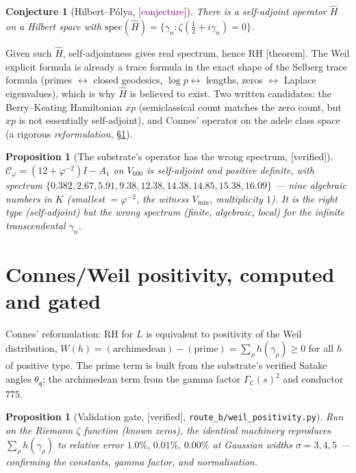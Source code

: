 \documentclass[11pt,a4paper]{article}
\newtheorem{proposition}[theorem]{Proposition}
\newtheorem{conjecture}[theorem]{Conjecture}
\theoremstyle{definition}
\newcommand{\C}{\mathbb{C}}
\newcommand{\Cphi}{\mathcal{C}_{\!\varphi}}
\newcommand{\Vmin}{V_{\min}}
\newcommand{\TAGthm}{{\small\textsf{[\textcolor{green!45!black}{theorem}]}}}
\newcommand{\TAGver}{{\small\textsf{[\textcolor{blue!60!black}{verified}]}}}
\newcommand{\TAGconj}{{\small\textsf{[\textcolor{purple}{conjecture}]}}}
\begin{document}
\begin{conjecture}[Hilbert--Pólya, \TAGconj]
There is a self-adjoint operator $\hat H$ on a Hilbert space with
$\mathrm{spec}(\hat H)=\{\gamma_n:\zeta(\tfrac12+i\gamma_n)=0\}$.
\end{conjecture}
Given such $\hat H$, self-adjointness gives real spectrum, hence RH \TAGthm.
The Weil explicit formula is already a trace formula in the exact shape of
the Selberg trace formula (primes $\leftrightarrow$ closed geodesics, $\log
p\leftrightarrow$ lengths, zeros $\leftrightarrow$ Laplace eigenvalues),
which is why $\hat H$ is believed to exist. Two written candidates: the
Berry--Keating Hamiltonian $xp$ (semiclassical count matches the zero count,
but $xp$ is not essentially self-adjoint), and Connes' operator on the adele
class space (a rigorous \emph{reformulation}, \S\ref{sec:connes}).

\begin{proposition}[The substrate's operator has the wrong spectrum, \TAGver]
$\Cphi=(12+\varphi^{-2})I-A_1$ on $V_{600}$ is self-adjoint and positive
definite, with spectrum
$\{0.382,2.67,5.91,9.38,12.38,14.38,14.85,15.38,16.09\}$ --- nine algebraic
numbers in $K$ (smallest $=\varphi^{-2}$, the witness $\Vmin$, multiplicity
$1$). It is the right \emph{type} (self-adjoint) but the wrong \emph{spectrum}
(finite, algebraic, local) for the infinite transcendental $\gamma_n$.
\end{proposition}

\section{Connes/Weil positivity, computed and gated}\label{sec:connes}

Connes' reformulation: RH for $L$ is equivalent to positivity of the Weil
distribution, $W(h)=(\text{archimedean})-(\text{prime})=\sum_\rho h(\gamma_\rho)\ge0$
for all $h$ of positive type. The prime term is built from the substrate's
verified Satake angles $\theta_\mathfrak{q}$; the archimedean term from the
gamma factor $\Gamma_\C(s)^2$ and conductor $775$.

\begin{proposition}[Validation gate, \TAGver, \texttt{route\_b/weil\_positivity.py}]
Run on the Riemann $\zeta$ function (known zeros), the identical machinery
reproduces $\sum_\rho h(\gamma_\rho)$ to relative error $1.0\%,\,0.01\%,\,0.00\%$
at Gaussian widths $\sigma=3,4,5$ --- confirming the constants, gamma factor,
and normalisation.
\end{proposition}
\end{document}
